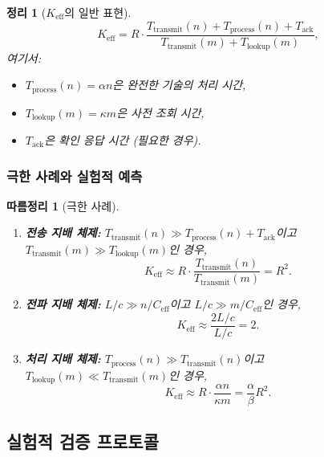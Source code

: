 \documentclass[11pt,a4paper]{article}
\newtheorem{theorem}{정리}
\newtheorem{corollary}{따름정리}
\begin{document}
\begin{theorem}[$K_{\mathrm{eff}}$의 일반 표현]
	\label{thm:keff-expression}
	\[
	K_{\mathrm{eff}} = R \cdot \frac{T_{\text{transmit}}(n) + T_{\text{process}}(n) + T_{\text{ack}}}{T_{\text{transmit}}(m) + T_{\text{lookup}}(m)},
	\]
	여기서:
	\begin{itemize}
		\item $T_{\text{process}}(n) = \alpha n$은 완전한 기술의 처리 시간,
		\item $T_{\text{lookup}}(m) = \kappa m$은 사전 조회 시간,
		\item $T_{\text{ack}}$은 확인 응답 시간 (필요한 경우).
	\end{itemize}
\end{theorem}

\subsubsection{극한 사례와 실험적 예측}

\begin{corollary}[극한 사례]
	\begin{enumerate}
		\item \textbf{전송 지배 체제:} $T_{\text{transmit}}(n) \gg T_{\text{process}}(n) + T_{\text{ack}}$이고 $T_{\text{transmit}}(m) \gg T_{\text{lookup}}(m)$인 경우,
		\[
		K_{\mathrm{eff}} \approx R \cdot \frac{T_{\text{transmit}}(n)}{T_{\text{transmit}}(m)} = R^2.
		\]
		
		\item \textbf{전파 지배 체제:} $L/c \gg n/C_{\text{eff}}$이고 $L/c \gg m/C_{\text{eff}}$인 경우,
		\[
		K_{\mathrm{eff}} \approx \frac{2L/c}{L/c} = 2.
		\]
		
		\item \textbf{처리 지배 체제:} $T_{\text{process}}(n) \gg T_{\text{transmit}}(n)$이고 $T_{\text{lookup}}(m) \ll T_{\text{transmit}}(m)$인 경우,
		\[
		K_{\mathrm{eff}} \approx R \cdot \frac{\alpha n}{\kappa m} = \frac{\alpha}{\beta} R^2.
		\]
	\end{enumerate}
\end{corollary}

\subsection{실험적 검증 프로토콜}
\end{document}
